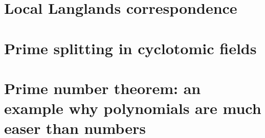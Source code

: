 \documentclass[a4paper]{memoir}
\begin{document}
\section{Local Langlands correspondence}

\section{Prime splitting in cyclotomic fields}

\section{Prime number theorem: an example why polynomials are much easer than numbers}



\end{document}
